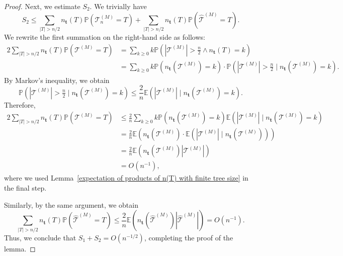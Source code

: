 \documentclass[article]{amsart}
\newcommand{\Prob} {\mathbb {P}}
\newcommand{\prob}[1]{\Prob\left(#1\right)}
\newcommand{\tc}{\mathcal{T}}
\newcommand{\st}{\textbf{t}}
\newcommand{\n}{n_{\st}}
\newcommand{\E}{\mathbb{E}}
\theoremstyle{definition}
\theoremstyle{remark}
\begin{document}
\begin{proof}
Next, we estimate $S_2$. We trivially have 
\[
S_2 \leq \sum_{|T| > n/2} \n(T) \prob{\tc_n^{(M)} = T} + \sum_{|T| > n/2} \n(T) \prob{\hat{\tc}^{(M)} = T}.
\]
We rewrite the first summation on the right-hand side as follows:
\begin{alignat*}{2}
    \sum_{|T| > n/2} \n(T) \prob{\tc^{(M)} = T} 
    &= \sum_{k \geq 0} k \prob{|\tc^{(M)}| > \tfrac{n}{2} \wedge \n(T) = k} \\
    &= \sum_{k \geq 0} k \prob{\n(\tc^{(M)}) = k} \cdot \prob{|\tc^{(M)}| > \tfrac{n}{2} \mid \n(\tc^{(M)}) = k}.
\end{alignat*}
By Markov's inequality, we obtain
\[
\prob{|\tc^{(M)}| > \tfrac{n}{2} \mid \n(\tc^{(M)}) = k} \leq \frac{2}{n} \E\left(|\tc^{(M)}| \mid \n(\tc^{(M)}) = k\right).
\]
Therefore,
\begin{alignat*}{2}
    \sum_{|T| > n/2} \n(T) \prob{\tc^{(M)} = T} 
    &\leq \frac{2}{n} \sum_{k \geq 0} k \prob{\n(\tc^{(M)}) = k} \E\left(|\tc^{(M)}| \mid \n(\tc^{(M)}) = k\right) \\
    &= \frac{2}{n} \E\left(\n(\tc^{(M)}) \cdot \E\left(|\tc^{(M)}| \mid \n(\tc^{(M)})\right)\right) \\
    &= \frac{2}{n} \E\left(\n(\tc^{(M)}) |\tc^{(M)}|\right) \\
    &= O(n^{-1}),
\end{alignat*}
where we used Lemma~\ref{expectation of products of n(T) with finite tree size} in the final step.

Similarly, by the same argument, we obtain
\[
\sum_{|T| > n/2} \n(T) \prob{\hat{\tc}^{(M)} = T} \leq \frac{2}{n} \E\left(\n(\hat{\tc}^{(M)}) |\hat{\tc}^{(M)}|\right) = O(n^{-1}).
\]
Thus, we conclude that $S_1 + S_2 = O(n^{-1/2})$, completing the proof of the lemma.
\end{proof}
\end{document}
